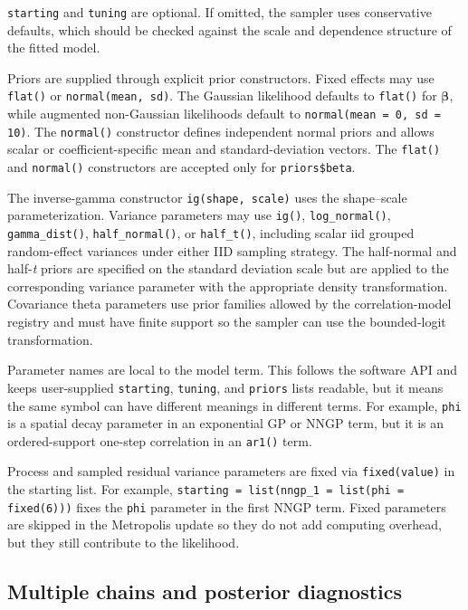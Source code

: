 \documentclass[11pt]{article}
\newcommand{\bbeta}{\bm{\beta}}
\begin{document}
\texttt{starting} and \texttt{tuning} are optional. If omitted, the sampler uses conservative defaults, which should be checked against the scale and dependence structure of the fitted model.

Priors are supplied through explicit prior constructors. Fixed effects may use \texttt{flat()} or \texttt{normal(mean, sd)}. The Gaussian likelihood defaults to \texttt{flat()} for $\bbeta$, while augmented non-Gaussian likelihoods default to \texttt{normal(mean = 0, sd = 10)}. The \texttt{normal()} constructor defines independent normal priors and allows scalar or coefficient-specific mean and standard-deviation vectors. The \texttt{flat()} and \texttt{normal()} constructors are accepted only for \texttt{priors\$beta}.

The inverse-gamma constructor \texttt{ig(shape, scale)} uses the shape--scale parameterization. Variance parameters may use \texttt{ig()}, \texttt{log\_normal()}, \texttt{gamma\_dist()}, \texttt{half\_normal()}, or \texttt{half\_t()}, including scalar iid grouped random-effect variances under either IID sampling strategy. The half-normal and half-\textit{t} priors are specified on the standard deviation scale but are applied to the corresponding variance parameter with the appropriate density transformation. Covariance theta parameters use prior families allowed by the correlation-model registry and must have finite support so the sampler can use the bounded-logit transformation.

Parameter names are local to the model term. This follows the software API and keeps user-supplied \texttt{starting}, \texttt{tuning}, and \texttt{priors} lists readable, but it means the same symbol can have different meanings in different terms. For example, \texttt{phi} is a spatial decay parameter in an exponential GP or NNGP term, but it is an ordered-support one-step correlation in an \texttt{ar1()} term.

Process and sampled residual variance parameters are fixed via \texttt{fixed(value)} in the starting list. For example, \texttt{starting = list(nngp\_1 = list(phi = fixed(6)))} fixes the \texttt{phi} parameter in the first NNGP term. Fixed parameters are skipped in the Metropolis update so they do not add computing overhead, but they still contribute to the likelihood.

\subsection{Multiple chains and posterior diagnostics}
\end{document}
